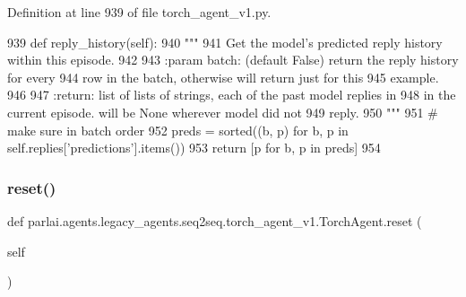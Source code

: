 Definition at line 939 of file torch\+\_\+agent\+\_\+v1.\+py.


\begin{DoxyCode}
939     \textcolor{keyword}{def }reply\_history(self):
940         \textcolor{stringliteral}{"""}
941 \textcolor{stringliteral}{        Get the model's predicted reply history within this episode.}
942 \textcolor{stringliteral}{}
943 \textcolor{stringliteral}{        :param batch: (default False) return the reply history for every}
944 \textcolor{stringliteral}{                      row in the batch, otherwise will return just for this}
945 \textcolor{stringliteral}{                      example.}
946 \textcolor{stringliteral}{}
947 \textcolor{stringliteral}{        :return: list of lists of strings, each of the past model replies in}
948 \textcolor{stringliteral}{                 in the current episode. will be None wherever model did not}
949 \textcolor{stringliteral}{                 reply.}
950 \textcolor{stringliteral}{        """}
951         \textcolor{comment}{# make sure in batch order}
952         preds = sorted((b, p) \textcolor{keywordflow}{for} b, p \textcolor{keywordflow}{in} self.replies[\textcolor{stringliteral}{'predictions'}].items())
953         \textcolor{keywordflow}{return} [p \textcolor{keywordflow}{for} b, p \textcolor{keywordflow}{in} preds]
954 
\end{DoxyCode}
\mbox{\label{classparlai_1_1agents_1_1legacy__agents_1_1seq2seq_1_1torch__agent__v1_1_1TorchAgent_a93e935c0d2d589d8990ff14d6e528c4d}} 
\subsubsection{\texorpdfstring{reset()}{reset()}}
{\footnotesize\ttfamily def parlai.\+agents.\+legacy\+\_\+agents.\+seq2seq.\+torch\+\_\+agent\+\_\+v1.\+Torch\+Agent.\+reset (\begin{DoxyParamCaption}\item[{}]{self }\end{DoxyParamCaption})}

